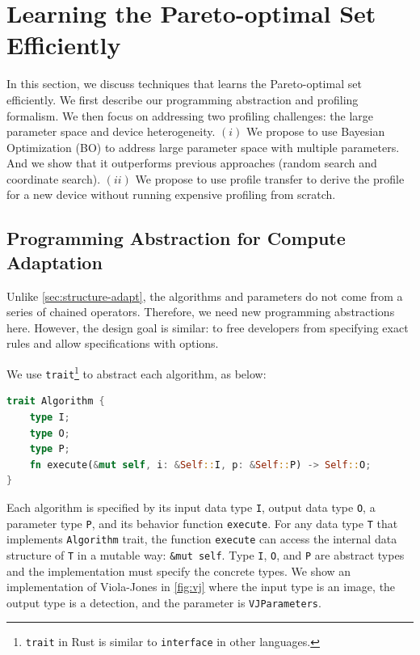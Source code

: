 \section{Learning the Pareto-optimal Set Efficiently }
\label{sec:learn-pareto-optim}

In this section, we discuss techniques that learns the Pareto-optimal set
efficiently. We first describe our programming abstraction and profiling
formalism. We then focus on addressing two profiling challenges: the large
parameter space and device heterogeneity. $(i)$ We propose to use Bayesian
Optimization (BO) to address large parameter space with multiple parameters. And
we show that it outperforms previous approaches (random search and coordinate
search). $(ii)$ We propose to use profile transfer to derive the profile for a
new device without running expensive profiling from scratch.

\subsection{Programming Abstraction for Compute Adaptation}
\label{sec:progr-abstr}

Unlike \autoref{sec:structure-adapt}, the algorithms and parameters do not come
from a series of chained operators. Therefore, we need new programming
abstractions here. However, the design goal is similar: to free developers from
specifying exact rules and allow specifications with options.

We use \texttt{trait}\footnote{\texttt{trait} in Rust is similar to
  \texttt{interface} in other languages.} to abstract each algorithm, as below:

\begin{lstlisting}[xleftmargin=.1\textwidth, xrightmargin=.1\textwidth, language=Rust]
trait Algorithm {
    type I;
    type O; 
    type P;
    fn execute(&mut self, i: &Self::I, p: &Self::P) -> Self::O;
}
\end{lstlisting}

Each algorithm is specified by its input data type \texttt{I}, output data type
\texttt{O}, a parameter type \texttt{P}, and its behavior function
\texttt{execute}. For any data type \texttt{T} that implements
\texttt{Algorithm} trait, the function \texttt{execute} can access the internal
data structure of \texttt{T} in a mutable way: \texttt{\&mut self}. Type
\texttt{I}, \texttt{O}, and \texttt{P} are abstract types and the implementation
must specify the concrete types. We show an implementation of Viola-Jones in
\autoref{fig:vj} where the input type is an image, the output type is a
detection, and the parameter is \texttt{VJParameters}.


